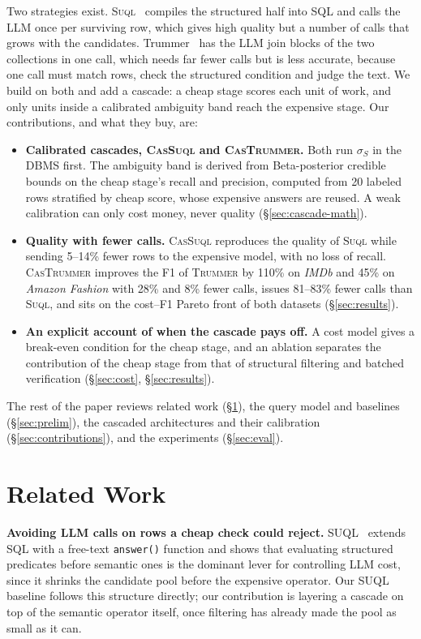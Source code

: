 \documentclass[sigconf]{acmart}
\begin{document}
Two strategies exist. \textsc{Suql}~\cite{liu2023suql} compiles the structured half into SQL and calls the LLM once per surviving row, which gives high quality but a number of calls that grows with the candidates. Trummer~\cite{trummer2025semanticjoin} has the LLM join blocks of the two collections in one call, which needs far fewer calls but is less accurate, because one call must match rows, check the structured condition and judge the text. We build on both and add a cascade: a cheap stage scores each unit of work, and only units inside a calibrated ambiguity band reach the expensive stage. Our contributions, and what they buy, are:
\begin{itemize}
  \item \textbf{Calibrated cascades, \textsc{CasSuql} and \textsc{CasTrummer}.} Both run $\sigma_S$ in the DBMS first. The ambiguity band is derived from Beta-posterior credible bounds on the cheap stage's recall and precision, computed from 20 labeled rows stratified by cheap score, whose expensive answers are reused. A weak calibration can only cost money, never quality (\S\ref{sec:cascade-math}).
  \item \textbf{Quality with fewer calls.} \textsc{CasSuql} reproduces the quality of \textsc{Suql} while sending 5--14\% fewer rows to the expensive model, with no loss of recall. \textsc{CasTrummer} improves the F1 of \textsc{Trummer} by 110\% on \textit{IMDb} and 45\% on \textit{Amazon Fashion} with 28\% and 8\% fewer calls, issues 81--83\% fewer calls than \textsc{Suql}, and sits on the cost--F1 Pareto front of both datasets (\S\ref{sec:results}).
  \item \textbf{An explicit account of when the cascade pays off.} A cost model gives a break-even condition for the cheap stage, and an ablation separates the contribution of the cheap stage from that of structural filtering and batched verification (\S\ref{sec:cost}, \S\ref{sec:results}).
\end{itemize}
The rest of the paper reviews related work (\S\ref{sec:related}), the query model and baselines (\S\ref{sec:prelim}), the cascaded architectures and their calibration (\S\ref{sec:contributions}), and the experiments (\S\ref{sec:eval}).

\section{Related Work}
\label{sec:related}

\textbf{Avoiding LLM calls on rows a cheap check could reject.}
SUQL~\cite{liu2023suql} extends SQL with a free-text \texttt{answer()} function and shows that evaluating structured predicates before semantic ones is the dominant lever for controlling LLM cost, since it shrinks the candidate pool before the expensive operator. Our SUQL baseline follows this structure directly; our contribution is layering a cascade on top of the semantic operator itself, once filtering has already made the pool as small as it can.
\end{document}

